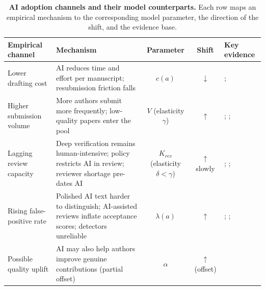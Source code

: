 \documentclass{article}
\begin{document}
\begin{table}[H]
\centering
\caption{\textbf{AI adoption channels and their model counterparts.}
Each row maps an empirical mechanism to the corresponding model parameter,
the direction of the shift, and the evidence base.}
\label{tab:ai_channels}
\renewcommand{\arraystretch}{1.4}
\begin{tabularx}{\textwidth}{p{2.8cm} p{4.0cm} c c p{3.6cm}}
\toprule
\textbf{Empirical channel} & \textbf{Mechanism} & \textbf{Parameter} & \textbf{Shift} & \textbf{Key evidence} \\
\midrule
Lower drafting cost
  & AI reduces time and effort per manuscript; resubmission friction falls
  & $c(a)$
  & $\downarrow$
  & \citet{NoyZhang2023}; \citet{StokelWalker2023} \\
Higher submission volume
  & More authors submit more frequently; low-quality papers enter the pool
  & $V$ (elasticity $\gamma$)
  & $\uparrow$
  & \citet{arXiv2024}; \citet{Liang2025}; \citet{Kobak2025} \\
Lagging review capacity
  & Deep verification remains human-intensive; policy restricts AI in review; reviewer shortage pre-dates AI
  & $K_{rev}$ (elasticity $\delta < \gamma$)
  & $\uparrow$ slowly
  & \citet{Meyerson2025}; \citet{Kovanis2016}; \citet{Naddaf2025} \\
Rising false-positive rate
  & Polished AI text harder to distinguish; AI-assisted reviews inflate acceptance scores; detectors unreliable
  & $\lambda(a)$
  & $\uparrow$
  & \citet{Liang2024ICML}; \citet{Latona2024}; \citet{Liang2023detectors} \\
Possible quality uplift
  & AI may also help authors improve genuine contributions (partial offset)
  & $\alpha$
  & $\uparrow$ (offset)
  & \citet{NoyZhang2023} \\
\bottomrule
\end{tabularx}
\end{table}
\end{document}
